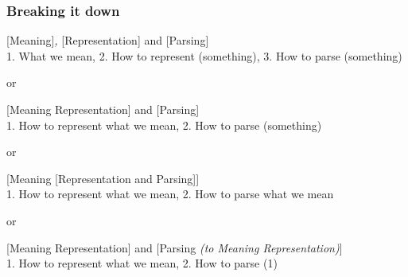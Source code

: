 \documentclass[t,xcolor={svgnames,table}]{beamer}
\begin{document}
\begin{frame}
\frametitle{Breaking it down}
\small
[Meaning]\textit{,} [Representation] and [Parsing] \\
1. What we mean, 2. How to represent (something), 3. How to parse (something)

\pause
\vfill
or
\vfill

[Meaning Representation] and [Parsing] \\
1. How to represent what we mean, 2. How to parse (something)

\pause
\vfill
or 
\vfill

[Meaning [Representation and Parsing]] \\
1. How to represent what we mean, 2. How to parse what we mean

\pause
\vfill
or 
\vfill

[Meaning Representation] and [Parsing \textit{(to Meaning Representation)}] \\
1. How to represent what we mean, 2. How to parse (1)
\end{frame}
\end{document}
